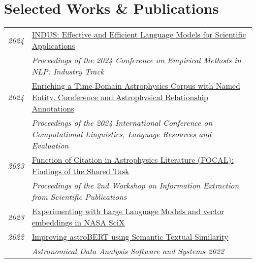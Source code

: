 \documentclass[a4paper,10pt]{article}
\begin{document}
\section{Selected Works \& Publications}
    \vspace{0.2cm}
    \begin{tabular}{rp{15.5cm}}


        \emph{2024} & \href{https://scixplorer.org/abs/2024AGUFMIN54B...1T/abstract}{INDUS: Effective and Efficient Language Models for Scientific Applications}\\
        \hphantom{\textbf{Hunter}} & \small{{\em Proceedings of the 2024 Conference on Empirical Methods in NLP: Industry Track}}
        \vspace{0.15cm} \\
        
        \emph{2024} & \href{https://scixplorer.org/abs/2024cllr.confE...1A/abstract}{Enriching a Time-Domain Astrophysics Corpus with Named Entity, Coreference and Astrophysical Relationship Annotations} \\
        & \small{{\em Proceedings of the 2024 International Conference on Computational Linguistics, Language Resources and Evaluation}}
        \vspace{0.15cm} \\

        \emph{2023} & \href{https://scixplorer.org/abs/2023wies.conf..143G/abstract}{Function of Citation in Astrophysics Literature (FOCAL): Findings of the Shared Task} \\
        & \small{{\em Proceedings of the 2nd Workshop on Information Extraction from Scientific Publications}}
        \vspace{0.15cm} \\ 

        \emph{2023} & \href{https://scixplorer.org/abs/2023arXiv231214211B/abstract}{Experimenting with Large Language Models and vector embeddings in NASA SciX}
        \vspace{0.15cm} \\

        \emph{2022} & \href{https://scixplorer.org/abs/2022arXiv221200744G/abstract}{Improving astroBERT using Semantic Textual Similarity}\\
        & \small{{\em Astronomical Data Analysis Software and Systems 2022}}
        \vspace{0.15cm} \\
        

\end{tabular}
\end{document}
